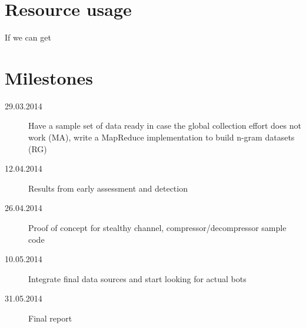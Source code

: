 \documentclass[a4paper,11pt]{article}
\begin{document}
\section{Resource usage}

If we can get 

\section{Milestones}

\begin{description}
	\item[29.03.2014] Have a sample set of data ready in case the global collection effort does not work (MA), write a MapReduce implementation to build n-gram datasets (RG)
	\item[12.04.2014] Results from early assessment and detection
	\item[26.04.2014] Proof of concept for stealthy channel, compressor/decompressor sample code
	\item[10.05.2014] Integrate final data sources and start looking for actual bots
	\item[31.05.2014] Final report 
\end{description}
\end{document}

